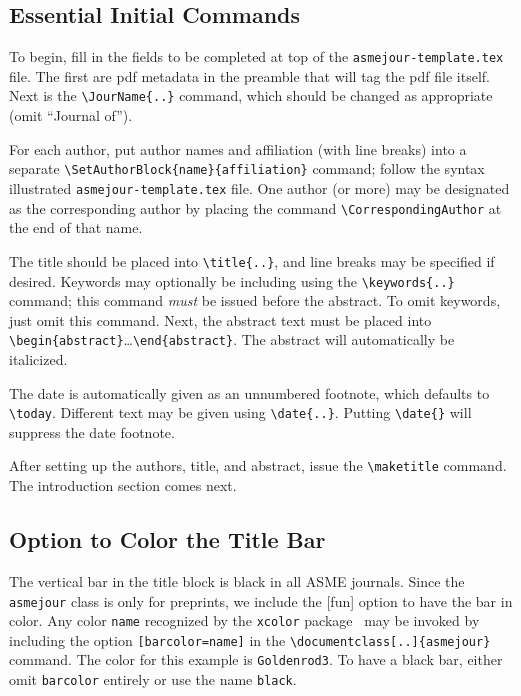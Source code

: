 \documentclass[balance,nocopyright,upint,varvw,hyphenate,barcolor=Goldenrod3,german]{asmejour}%
\begin{document}
\subsection{Essential Initial Commands}
To begin, fill in the fields to be completed at top of the \texttt{asmejour-template.tex} file. The first are pdf metadata in the preamble that will tag the pdf file itself. Next is the \verb|\JourName{..}| command, which should be changed as appropriate (omit ``Journal of'').

For each author, put author names and affiliation (with line breaks) into a separate \verb|\SetAuthorBlock{name}{affiliation}| command; follow the syntax illustrated \texttt{asmejour-template.tex} file.  One author (or more) may be designated as the corresponding author  by placing the command \verb|\CorrespondingAuthor| at the end of that name.

The title should be placed into \verb|\title{..}|, and line breaks may be specified if desired. Keywords may optionally be including using the \verb|\keywords{..}| command; this command \emph{must} be issued before the abstract. To omit keywords, just omit this command. Next, the abstract text must be placed into \verb|\begin{abstract}|\ldots\verb|\end{abstract}|. The abstract will automatically be italicized.

The date is automatically given as an unnumbered footnote, which defaults to \verb|\today|. Different text may be given using \verb|\date{..}|. Putting \verb|\date{}| will suppress the date footnote.

After setting up the authors, title, and abstract, issue the \verb|\maketitle| command. The introduction section comes next.

\subsection{Option to Color the Title Bar}
The vertical bar in the title block is black in all ASME journals. Since the \texttt{asmejour} class is only for preprints, we include the [fun] option to have the bar in color. Any color \texttt{name} recognized by the \texttt{xcolor} package~\cite{kern} may be invoked by including the option \texttt{[barcolor=name]} in the \verb|\documentclass[..]{asmejour}| command. The color for this example is \texttt{Goldenrod3}. To have a black bar, either omit \texttt{barcolor} entirely or use the name \texttt{black}.
\end{document}
